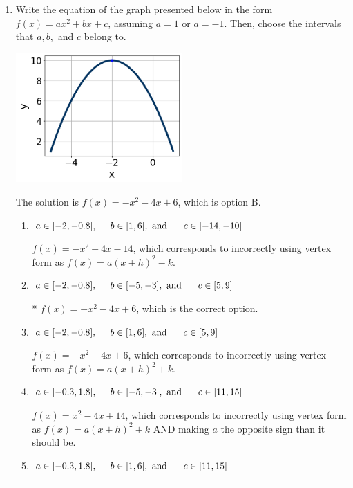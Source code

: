 \documentclass{extbook}[14pt]
\newcommand{\litem}[1]{\item #1

\rule{\textwidth}{0.4pt}}
\begin{document}
\begin{enumerate}\litem{
Write the equation of the graph presented below in the form $f(x)=ax^2+bx+c$, assuming  $a=1$ or $a=-1$. Then, choose the intervals that $a, b,$ and $c$ belong to.

\begin{center}
    \includegraphics[width=0.5\textwidth]{../Figures/quadraticGraphToEquationA.png}
\end{center}


The solution is \( f(x) = -x^{2} -4 x + 6 \), which is option B.\begin{enumerate}[label=\Alph*.]
\item \( a \in [-2, -0.8], \hspace*{5mm} b \in [1, 6], \text{ and } \hspace*{5mm} c \in [-14, -10] \)

$f(x)=-x^{2} +4 x -14$, which corresponds to incorrectly using vertex form as $f(x) = a(x+h)^2 - k$.
\item \( a \in [-2, -0.8], \hspace*{5mm} b \in [-5, -3], \text{ and } \hspace*{5mm} c \in [5, 9] \)

* $f(x)=-x^{2} -4 x + 6$, which is the correct option.
\item \( a \in [-2, -0.8], \hspace*{5mm} b \in [1, 6], \text{ and } \hspace*{5mm} c \in [5, 9] \)

$f(x)=-x^{2} +4 x + 6$, which corresponds to incorrectly using vertex form as $f(x) = a(x+h)^2+k$.
\item \( a \in [-0.3, 1.8], \hspace*{5mm} b \in [-5, -3], \text{ and } \hspace*{5mm} c \in [11, 15] \)

$f(x)=x^{2} -4 x + 14$, which corresponds to incorrectly using vertex form as $f(x) = a(x+h)^2+k$ AND making $a$ the opposite sign than it should be.
\item \( a \in [-0.3, 1.8], \hspace*{5mm} b \in [1, 6], \text{ and } \hspace*{5mm} c \in [11, 15] \)


\end{enumerate}}
\end{enumerate}
\end{document}
